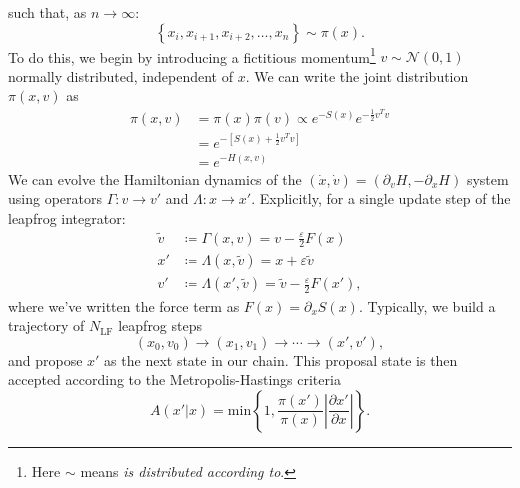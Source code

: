 \documentclass[a4paper,11pt]{article}
\begin{document}
%
such that, as $n \rightarrow \infty$:
%
\begin{equation}
\left\{x_{i}, x_{i+1}, x_{i+2}, \ldots, x_{n}\right\} \sim \pi(x).
\end{equation}
%
To do this, we begin by introducing a fictitious momentum\footnote{Here $\sim$
means \textit{is distributed according to}.} $v \sim \mathcal{N}(0, 1)$
normally distributed, independent of $x$.
%
We can write the joint distribution $\pi(x, v)$ as
%
\begin{align}
\pi(x, v) &= \pi(x) \pi(v) \propto e^{-S(x)} e^{-\frac{1}{2} v^{T}v} \\
&= e^{-\left[S(x) + \frac{1}{2} v^{T} v \right]} \\
&= e^{-H(x, v)}
\end{align}
%
We can evolve the Hamiltonian dynamics of the $(\dot{x}, \dot{v}) =
(\partial_{v} H, -\partial_{x} H)$ system using operators $\Gamma: v
\rightarrow v'$ and $\Lambda: x \rightarrow x'$.
%
Explicitly, for a single update step of the leapfrog integrator:
%
\begin{align}
\tilde{v} &\coloneqq \Gamma(x, v) = v - \frac{\varepsilon}{2} F(x) \\
x' &\coloneqq \Lambda(x, \tilde{v}) = x + \varepsilon \tilde{v} \\
v' &\coloneqq \Lambda(x', \tilde{v}) = \tilde{v} - \frac{\varepsilon}{2} F(x'),
\end{align}
%
where we've written the force term as $F(x) = \partial_{x}S(x)$.
%
Typically, we build a trajectory of $N_{\mathrm{LF}}$ leapfrog steps
%
\begin{equation}
(x_{0}, v_{0}) \rightarrow (x_{1}, v_{1}) \rightarrow \cdots \rightarrow (x', v'),
\end{equation}
%
and propose $x'$ as the next state in our chain.
%
This proposal state is then accepted according to the Metropolis-Hastings
criteria~\cite{robert_metropolis-hastings_2016}
%
\begin{equation}
A(x'|x) = \mathrm{min}\left\{{1, \frac{\pi(x')}{\pi(x)} \left| \frac{\partial x'}{\partial x} \right|}\right\}.
\end{equation}
%
\end{document}
